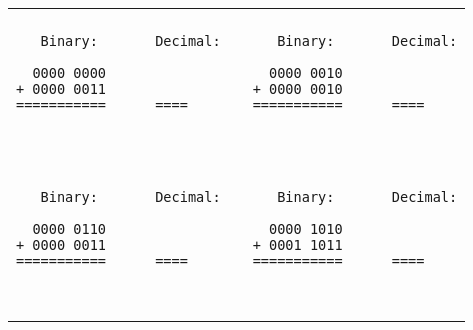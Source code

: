 \begin{tabular}{p{3in} | c  p{3in} }
\hline
\\
\begin{minipage}{2.95in}
\begin{verbatim}
   Binary:       Decimal:

  0000 0000      
+ 0000 0011      
===========      ====

___________      ____
\end{verbatim}
\end{minipage}

&&

\begin{minipage}{2.95in}
\begin{verbatim}
   Binary:       Decimal:

  0000 0010      
+ 0000 0010      
===========      ====

___________      ____
\end{verbatim}
\end{minipage}

\\
\hline
\\

\begin{minipage}{2.95in}
\begin{verbatim}
   Binary:       Decimal:

  0000 0110      
+ 0000 0011      
===========      ====

___________      ____
\end{verbatim}
\end{minipage}

&&

\begin{minipage}{2.95in}
\begin{verbatim}
   Binary:       Decimal:

  0000 1010      
+ 0001 1011      
===========      ====

___________      ____
\end{verbatim}
\end{minipage}

\\
\hline
\end{tabular}




